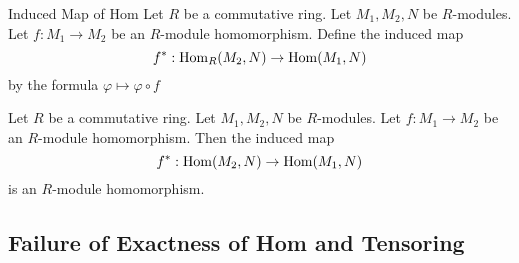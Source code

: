 \documentclass[a4paper]{article}
\begin{document}
\begin{defn}{Induced Map of Hom}{} Let $R$ be a commutative ring. Let $M_1,M_2,N$ be $R$-modules. Let $f:M_1\to M_2$ be an $R$-module homomorphism. Define the induced map $$f^\ast:\operatorname{Hom}_R(M_2,N)\to\operatorname{Hom}(M_1,N)$$ by the formula $\varphi\mapsto\varphi\circ f$
\end{defn}

\begin{lmm}{}{} Let $R$ be a commutative ring. Let $M_1,M_2,N$ be $R$-modules. Let $f:M_1\to M_2$ be an $R$-module homomorphism. Then the induced map $$f^\ast:\operatorname{Hom}(M_2,N)\to\operatorname{Hom}(M_1,N)$$ is an $R$-module homomorphism. 
\end{lmm}

\subsection{Failure of Exactness of Hom and Tensoring}
\end{document}
